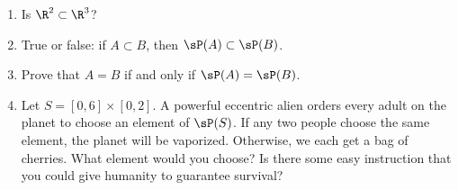 \probsec{~\ref{sec:power-set}}
\begin{enumerate}
    \item Is $\R^2 \subset \R^3$?

    \item True or false: if $A \subset B$, then $\sP(A) \subset \sP(B)$.

    \item Prove that $A = B$ if and only if $\sP(A) = \sP(B)$.

    \item Let $S = [0,6] \times [0,2]$. A powerful eccentric alien orders every adult on the planet to choose an element of $\sP(S)$. If any two people choose the same element, the planet will be vaporized. Otherwise, we each get a bag of cherries. What element would you choose? Is there some easy instruction that you could give humanity to guarantee survival?
\end{enumerate}
